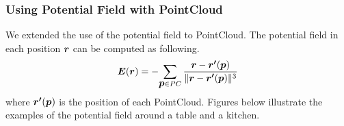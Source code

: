 \subsubsection{Using Potential Field with PointCloud}
We extended the use of the potential field to PointCloud. The potential field in each position \(\mbox{\boldmath $r$}\) can be computed as following.
\begin{equation}
  \label{equation:electronic_potential_pointcloud}
  \mbox{\boldmath $E$}(\mbox{\boldmath $r$}) = - {\sum_{\mbox{\boldmath $p$} \in PC} { \frac {\mbox{\boldmath $r$} - \mbox{\boldmath $r'$}(\mbox{\boldmath $p$})} {\| \mbox{\boldmath $r$} - \mbox{\boldmath $r'$}(\mbox{\boldmath $p$}) \| ^ 3} } }
\end{equation}
where \(\mbox{\boldmath $r'$}(\mbox{\boldmath $p$})\) is the position of each PointCloud. Figures below illustrate the examples of the potential field around a table and a kitchen.

